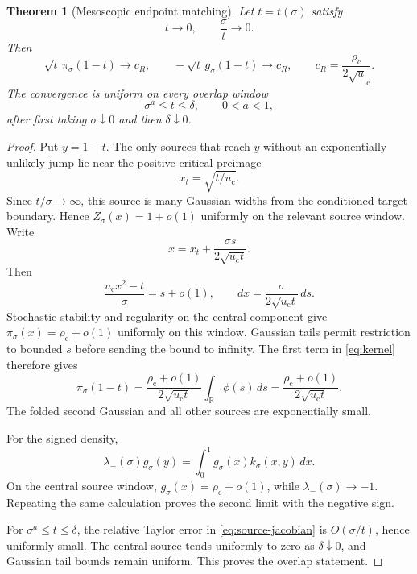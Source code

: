 \documentclass[11pt]{article}
\newtheorem{theorem}{Theorem}[section]
\theoremstyle{remark}
\newcommand{\R}{\mathbb R}
\newcommand{\uc}{u_{\mathrm c}}
\newcommand{\rhop}{\rho_{\mathrm c}}
\begin{document}
\begin{theorem}[Mesoscopic endpoint matching]
\label{thm:mesoscopic}
Let $t=t(\sigma)$ satisfy
\begin{equation}
 t\longrightarrow0,
 \qquad
 \frac{\sigma}{t}\longrightarrow0.
 \label{eq:mesoscopic-regime}
\end{equation}
Then
\begin{equation}
 \sqrt t\,\pi_\sigma(1-t)\longrightarrow c_R,
 \qquad
 -\sqrt t\,g_\sigma(1-t)\longrightarrow c_R,
 \qquad
 c_R=\frac{\rhop}{2\sqrt\uc}.
 \label{eq:mesoscopic-law}
\end{equation}
The convergence is uniform on every overlap window
\begin{equation}
 \sigma^a\le t\le\delta,
 \qquad 0<a<1,
 \label{eq:overlap-window}
\end{equation}
after first taking $\sigma\downarrow0$ and then $\delta\downarrow0$.
\end{theorem}

\begin{proof}
Put $y=1-t$.  The only sources that reach $y$ without an exponentially
unlikely jump lie near the positive critical preimage
\begin{equation}
 x_t=\sqrt{t/\uc}.
 \label{eq:critical-preimage}
\end{equation}
Since $t/\sigma\to\infty$, this source is many Gaussian widths from the
conditioned target boundary.  Hence $Z_\sigma(x)=1+o(1)$ uniformly on the
relevant source window.  Write
\begin{equation}
 x=x_t+\frac{\sigma s}{2\sqrt{\uc t}}.
 \label{eq:source-scaling}
\end{equation}
Then
\begin{equation}
 \frac{\uc x^2-t}{\sigma}=s+o(1),
 \qquad
 dx=\frac{\sigma}{2\sqrt{\uc t}}\,ds.
 \label{eq:source-jacobian}
\end{equation}
Stochastic stability and regularity on the central component give
$\pi_\sigma(x)=\rhop+o(1)$ uniformly on this window.  Gaussian tails permit
restriction to bounded $s$ before sending the bound to infinity.  The first
term in \eqref{eq:kernel} therefore gives
\begin{equation}
 \pi_\sigma(1-t)
 =\frac{\rhop+o(1)}{2\sqrt{\uc t}}\int_\R\phi(s)\,ds
 =\frac{\rhop+o(1)}{2\sqrt{\uc t}}.
 \label{eq:stationary-laplace}
\end{equation}
The folded second Gaussian and all other sources are exponentially small.

For the signed density,
\begin{equation}
 \lambda_-(\sigma)g_\sigma(y)
 =\int_0^1g_\sigma(x)k_\sigma(x,y)\,dx.
 \label{eq:g-eigenrelation}
\end{equation}
On the central source window,
$g_\sigma(x)=\rhop+o(1)$, while
$\lambda_-(\sigma)\to-1$.  Repeating the same calculation proves the second
limit with the negative sign.

For $\sigma^a\le t\le\delta$, the relative Taylor error in
\eqref{eq:source-jacobian} is $O(\sigma/t)$, hence uniformly small.  The
central source tends uniformly to zero as $\delta\downarrow0$, and Gaussian
tail bounds remain uniform.  This proves the overlap statement.
\end{proof}
\end{document}
